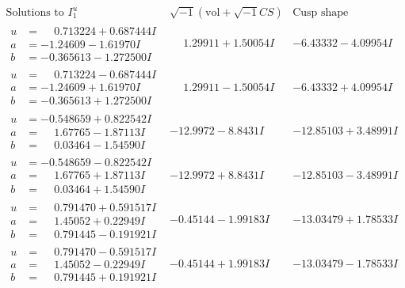 \documentclass[1p]{elsarticle_modified}
\theoremstyle{definition}
\newcommand{\I}{\sqrt{-1}}
\begin{document}
$$\begin{array}{c|c|c}  
\text{Solutions to }I^u_{1}& \I (\text{vol} + \sqrt{-1}CS) & \text{Cusp shape}\\
 \hline 
\begin{aligned}
u &= \phantom{-}0.713224 + 0.687444 I \\
a &= -1.24609 - 1.61970 I \\
b &= -0.365613 - 1.272500 I\end{aligned}
 & \phantom{-}1.29911 + 1.50054 I & -6.43332 - 4.09954 I \\ \hline\begin{aligned}
u &= \phantom{-}0.713224 - 0.687444 I \\
a &= -1.24609 + 1.61970 I \\
b &= -0.365613 + 1.272500 I\end{aligned}
 & \phantom{-}1.29911 - 1.50054 I & -6.43332 + 4.09954 I \\ \hline\begin{aligned}
u &= -0.548659 + 0.822542 I \\
a &= \phantom{-}1.67765 - 1.87113 I \\
b &= \phantom{-}0.03464 - 1.54590 I\end{aligned}
 & -12.9972 - 8.8431 I & -12.85103 + 3.48991 I \\ \hline\begin{aligned}
u &= -0.548659 - 0.822542 I \\
a &= \phantom{-}1.67765 + 1.87113 I \\
b &= \phantom{-}0.03464 + 1.54590 I\end{aligned}
 & -12.9972 + 8.8431 I & -12.85103 - 3.48991 I \\ \hline\begin{aligned}
u &= \phantom{-}0.791470 + 0.591517 I \\
a &= \phantom{-}1.45052 + 0.22949 I \\
b &= \phantom{-}0.791445 - 0.191921 I\end{aligned}
 & -0.45144 - 1.99183 I & -13.03479 + 1.78533 I \\ \hline\begin{aligned}
u &= \phantom{-}0.791470 - 0.591517 I \\
a &= \phantom{-}1.45052 - 0.22949 I \\
b &= \phantom{-}0.791445 + 0.191921 I\end{aligned}
 & -0.45144 + 1.99183 I & -13.03479 - 1.78533 I \\ \hline\begin{aligned}

\end{aligned}
\end{array}$$
\end{document}
